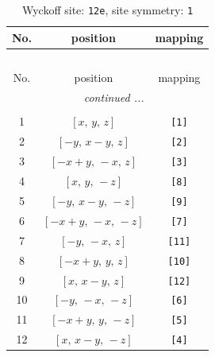 \documentclass[fleqn,8pt]{jsarticle}
\begin{document}
\begin{longtable}{ccc}
\caption{Wyckoff site: {\tt 12e}, site symmetry: {\tt 1}}
 \\
 \hline \hline
No. & position & mapping \\ \hline \endfirsthead

\multicolumn{2}{l}{\tablename\ \thetable{}} \\
 \hline \hline
No. & position & mapping \\ \hline \endhead

 \hline \hline
\multicolumn{2}{r}{\footnotesize\it continued ...} \\ \endfoot

 \hline \hline
\multicolumn{2}{r}{} \\ \endlastfoot

1 & $\left[ x,\, y,\, z \right]$ & {\tt [1]} \\ \hline
2 & $\left[ - y,\, x - y,\, z \right]$ & {\tt [2]} \\ \hline
3 & $\left[ - x + y,\, - x,\, z \right]$ & {\tt [3]} \\ \hline
4 & $\left[ x,\, y,\, - z \right]$ & {\tt [8]} \\ \hline
5 & $\left[ - y,\, x - y,\, - z \right]$ & {\tt [9]} \\ \hline
6 & $\left[ - x + y,\, - x,\, - z \right]$ & {\tt [7]} \\ \hline
7 & $\left[ - y,\, - x,\, z \right]$ & {\tt [11]} \\ \hline
8 & $\left[ - x + y,\, y,\, z \right]$ & {\tt [10]} \\ \hline
9 & $\left[ x,\, x - y,\, z \right]$ & {\tt [12]} \\ \hline
10 & $\left[ - y,\, - x,\, - z \right]$ & {\tt [6]} \\ \hline
11 & $\left[ - x + y,\, y,\, - z \right]$ & {\tt [5]} \\ \hline
12 & $\left[ x,\, x - y,\, - z \right]$ & {\tt [4]} \\
\end{longtable}
\end{document}
